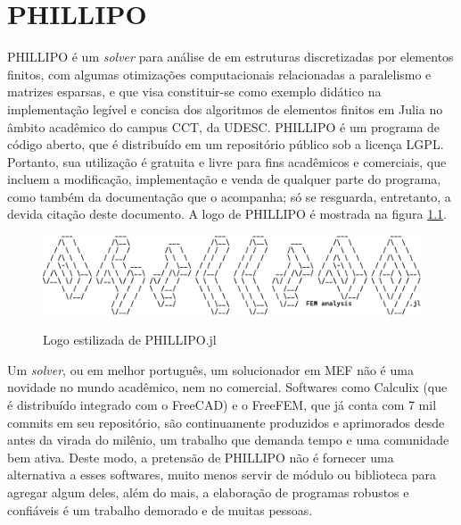 

\chapter{PHILLIPO}

PHILLIPO é um \emph{solver} para análise de em estruturas discretizadas por elementos finitos, com algumas otimizações computacionais relacionadas a paralelismo e matrizes esparsas, e que visa constituir-se como exemplo didático na implementação legível e concisa dos algoritmos de elementos finitos em Julia no âmbito acadêmico do campus CCT, da UDESC. PHILLIPO é um programa de código aberto, que é distribuído em um repositório público\footnotemark[1]{} sob a licença LGPL\footnotemark[2]{}. Portanto, sua utilização é gratuita e livre para fins acadêmicos e comerciais, que incluem a modificação, implementação e venda de qualquer parte do programa, como também da documentação que o acompanha; só se resguarda, entretanto, a devida citação deste documento. A logo de PHILLIPO é mostrada na figura \ref{fig:log_phillipo}.

\begin{figure}[hbtp]
    \centering
    \caption{Logo estilizada de PHILLIPO.jl}
    \includegraphics[width = \textwidth]{Figuras/logo_phillipo.pdf}
    \label{fig:log_phillipo}
\end{figure}

Um \emph{solver}, ou em melhor português, um solucionador em MEF não é uma novidade no mundo acadêmico, nem no comercial. Softwares como Calculix (que é distribuído integrado com o FreeCAD) e o FreeFEM, que já conta com 7 mil commits em seu repositório, são continuamente produzidos e aprimorados desde antes da virada do milênio, um trabalho que demanda tempo e uma comunidade bem ativa. Deste modo, a pretensão de PHILLIPO não é fornecer uma alternativa a esses softwares, muito menos servir de módulo ou biblioteca para agregar algum deles, além do mais, a elaboração de programas robustos e confiáveis é um trabalho demorado e de muitas pessoas.

